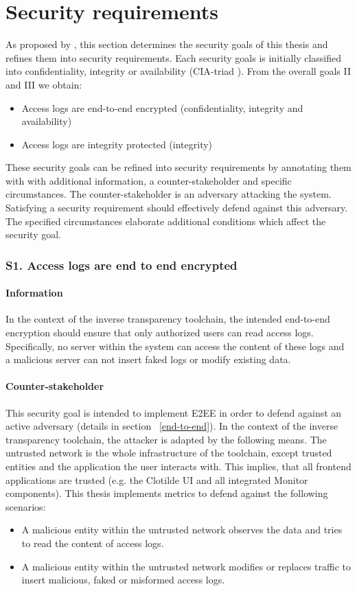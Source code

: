 \documentclass[../main.tex]{subfiles}
\begin{document}
\section{Security requirements}\label{security-requriements}
As proposed by \citeauthor{Fabian2010}, this section determines the security goals of this thesis and refines them into security requirements.
Each security goals is initially classified into confidentiality, integrity or availability (CIA-triad ). 
From the overall goals II and III we obtain:
\begin{itemize}
    \item Access logs are end-to-end encrypted (confidentiality, integrity and availability)
    \item Access logs are integrity protected (integrity)
\end{itemize}

These security goals can be refined into security requirements by annotating them with with additional information, a counter-stakeholder and specific circumstances.
The counter-stakeholder is an adversary attacking the system.
Satisfying a security requirement should effectively defend against this adversary.
The specified circumstances elaborate additional conditions which affect the security goal.

\subsubsection{S1. Access logs are end to end encrypted}

\paragraph{Information}
In the context of the inverse transparency toolchain, the intended end-to-end encryption should ensure that only authorized users can read access logs.
Specifically, no server within the system can access the content of these logs and a malicious server can not insert faked logs or modify existing data.

\paragraph{Counter-stakeholder}
This security goal is intended to implement E2EE in order to defend against an active adversary (details in section ~\ref{end-to-end}).
In the context of the inverse transparency toolchain, the attacker is adapted by the following means. 
The untrusted network is the whole infrastructure of the toolchain, except trusted entities and the application the user interacts with.
This implies, that all frontend applications are trusted (e.g. the Clotilde UI and all integrated Monitor components).
This thesis implements metrics to defend against the following scenarios:
\begin{itemize}
    \item A malicious entity within the untrusted network observes the data and tries to read the content of access logs.
    \item A malicious entity within the untrusted network modifies or replaces traffic to insert malicious, faked or misformed access logs.
\end{itemize}
\end{document}
